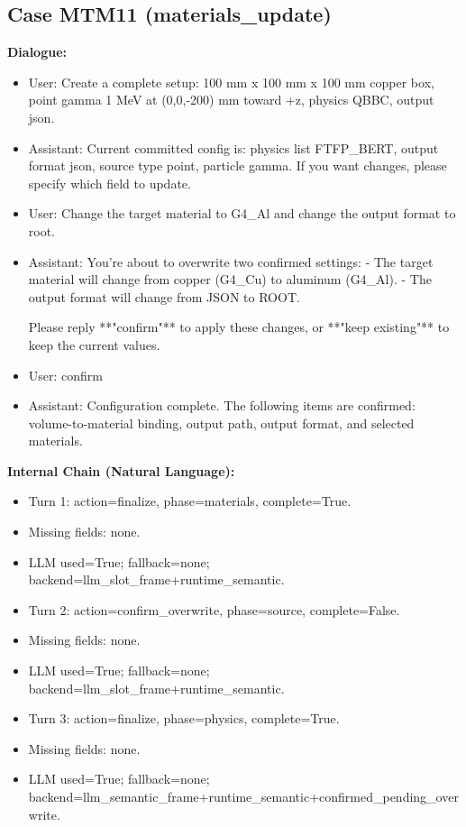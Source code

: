 \documentclass[11pt]{ctexart}
\begin{document}
\subsection{Case MTM11 (materials\_update)}
\textbf{Dialogue:}
\begin{itemize}
\item User: Create a complete setup: 100 mm x 100 mm x 100 mm copper box, point gamma 1 MeV at (0,0,-200) mm toward +z, physics QBBC, output json.
\item Assistant: Current committed config is: physics list FTFP\_BERT, output format json, source type point, particle gamma. If you want changes, please specify which field to update.
\item User: Change the target material to G4\_Al and change the output format to root.
\item Assistant: You're about to overwrite two confirmed settings:
- The target material will change from copper (G4\_Cu) to aluminum (G4\_Al).
- The output format will change from JSON to ROOT.

Please reply **"confirm"** to apply these changes, or **"keep existing"** to keep the current values.
\item User: confirm
\item Assistant: Configuration complete. The following items are confirmed: volume-to-material binding, output path, output format, and selected materials.
\end{itemize}
\textbf{Internal Chain (Natural Language):}
\begin{itemize}
\item Turn 1: action=finalize, phase=materials, complete=True.
\item Missing fields: none.
\item LLM used=True; fallback=none; backend=llm\_slot\_frame+runtime\_semantic.
\item Turn 2: action=confirm\_overwrite, phase=source, complete=False.
\item Missing fields: none.
\item LLM used=True; fallback=none; backend=llm\_slot\_frame+runtime\_semantic.
\item Turn 3: action=finalize, phase=physics, complete=True.
\item Missing fields: none.
\item LLM used=True; fallback=none; backend=llm\_semantic\_frame+runtime\_semantic+confirmed\_pending\_overwrite.
\end{itemize}
\end{document}

